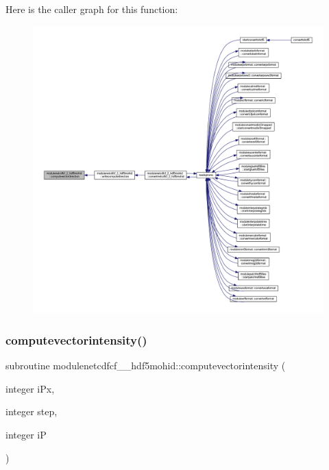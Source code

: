 Here is the caller graph for this function\+:\nopagebreak
\begin{figure}[H]
\begin{center}
\leavevmode
\includegraphics[width=350pt]{namespacemodulenetcdfcf__2__hdf5mohid_a035fed19e9c4075ee7babb392fe071e6_icgraph}
\end{center}
\end{figure}
\mbox{\label{namespacemodulenetcdfcf__2__hdf5mohid_a554c4456ac5359021e717df4e2d16fdf}} 
\subsubsection{\texorpdfstring{computevectorintensity()}{computevectorintensity()}}
{\footnotesize\ttfamily subroutine modulenetcdfcf\+\_\+\_\+hdf5mohid\+::computevectorintensity (\begin{DoxyParamCaption}\item[{integer}]{i\+Px,  }\item[{integer}]{step,  }\item[{integer}]{iP }\end{DoxyParamCaption})\hspace{0.3cm}{\ttfamily [private]}}

